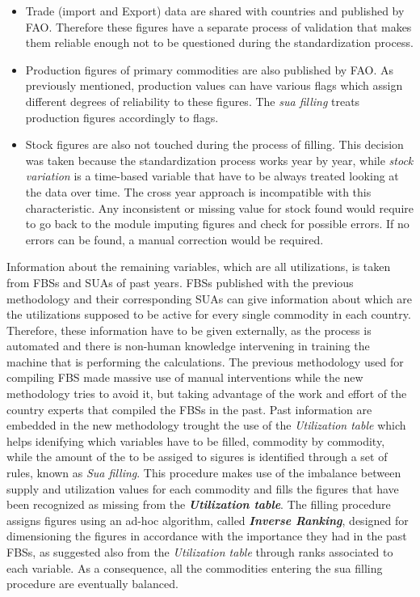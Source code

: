 \documentclass[]{article}
\providecommand{\tightlist}{%
  \setlength{\itemsep}{0pt}\setlength{\parskip}{0pt}}
\begin{document}
\begin{itemize}
\tightlist
\item
  Trade (import and Export) data are shared with countries and published
  by FAO. Therefore these figures have a separate process of validation
  that makes them reliable enough not to be questioned during the
  standardization process.
\item
  Production figures of primary commodities are also published by FAO.
  As previously mentioned, production values can have various flags
  which assign different degrees of reliability to these figures. The
  \emph{sua filling} treats production figures accordingly to flags.
\item
  Stock figures are also not touched during the process of filling. This
  decision was taken because the standardization process works year by
  year, while \emph{stock variation} is a time-based variable that have
  to be always treated looking at the data over time. The cross year
  approach is incompatible with this characteristic. Any inconsistent or
  missing value for stock found would require to go back to the module
  imputing figures and check for possible errors. If no errors can be
  found, a manual correction would be required.
\end{itemize}

Information about the remaining variables, which are all utilizations,
is taken from FBSs and SUAs of past years. FBSs published with the
previous methodology and their corresponding SUAs can give information
about which are the utilizations supposed to be active for every single
commodity in each country.\\
Therefore, these information have to be given externally, as the process
is automated and there is non-human knowledge intervening in training
the machine that is performing the calculations. The previous
methodology used for compiling FBS made massive use of manual
interventions while the new methodology tries to avoid it, but taking
advantage of the work and effort of the country experts that compiled
the FBSs in the past. Past information are embedded in the new
methodology trought the use of the \emph{Utilization table} which helps
idenifying which variables have to be filled, commodity by commodity,
while the amount of the to be assiged to sigures is identified through a
set of rules, known as \emph{Sua filling}. This procedure makes use of
the imbalance between supply and utilization values for each commodity
and fills the figures that have been recognized as missing from the
\textbf{\emph{Utilization table}}. The filling procedure assigns figures
using an ad-hoc algorithm, called \textbf{\emph{Inverse Ranking}},
designed for dimensioning the figures in accordance with the importance
they had in the past FBSs, as suggested also from the \emph{Utilization
table} through ranks associated to each variable. As a consequence, all
the commodities entering the sua filling procedure are eventually
balanced.
\end{document}
